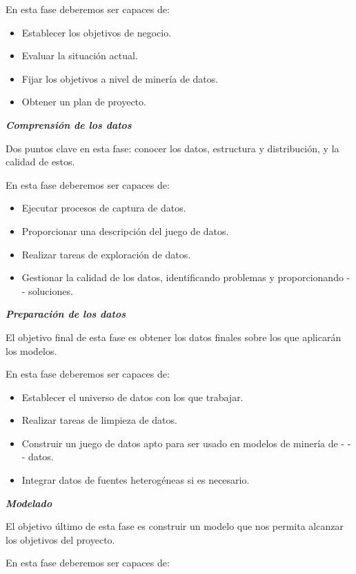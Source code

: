 \documentclass[
]{article}
\providecommand{\tightlist}{%
  \setlength{\itemsep}{0pt}\setlength{\parskip}{0pt}}
\begin{document}
En esta fase deberemos ser capaces de:

\begin{itemize}
\tightlist
\item
  Establecer los objetivos de negocio.
\item
  Evaluar la situación actual.
\item
  Fijar los objetivos a nivel de minería de datos.
\item
  Obtener un plan de proyecto.
\end{itemize}

\textbf{\emph{Comprensión de los datos}}

Dos puntos clave en esta fase: conocer los datos, estructura y
distribución, y la calidad de estos.

En esta fase deberemos ser capaces de:

\begin{itemize}
\tightlist
\item
  Ejecutar procesos de captura de datos.
\item
  Proporcionar una descripción del juego de datos.
\item
  Realizar tareas de exploración de datos.
\item
  Gestionar la calidad de los datos, identificando problemas y
  proporcionando - - soluciones.
\end{itemize}

\textbf{\emph{Preparación de los datos}}

El objetivo final de esta fase es obtener los datos finales sobre los
que aplicarán los modelos.

En esta fase deberemos ser capaces de:

\begin{itemize}
\tightlist
\item
  Establecer el universo de datos con los que trabajar.
\item
  Realizar tareas de limpieza de datos.
\item
  Construir un juego de datos apto para ser usado en modelos de minería
  de - - - datos.
\item
  Integrar datos de fuentes heterogéneas si es necesario.
\end{itemize}

\textbf{\emph{Modelado}}

El objetivo último de esta fase es construir un modelo que nos permita
alcanzar los objetivos del proyecto.

En esta fase deberemos ser capaces de:
\end{document}
